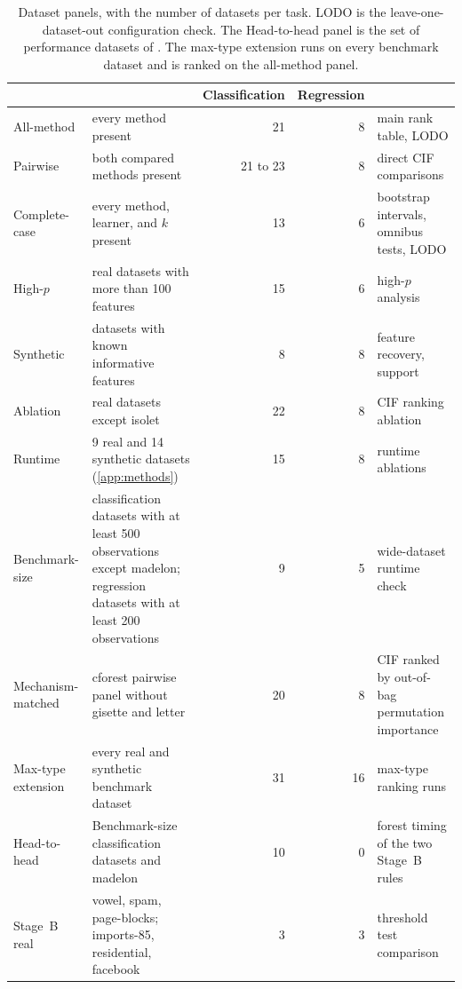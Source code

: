 \begin{table}[htb]
  \centering
  \footnotesize
  \setlength{\tabcolsep}{3pt}
  \begin{tabular}{@{}lL{5.45cm}rrL{3.9cm}@{}}
    \toprule
     &  & Classification & Regression &  \\
    \midrule
    All-method & every method present & 21 & 8 & main rank table, LODO \\
    Pairwise & both compared methods present & 21 to 23 & 8 & direct CIF comparisons \\
    Complete-case & every method, learner, and $k$ present & 13 & 6 & bootstrap intervals, omnibus tests, LODO \\
    High-$p$ & real datasets with more than 100 features & 15 & 6 & high-$p$ analysis \\
    Synthetic & datasets with known informative features & 8 & 8 & feature recovery, support \\
    Ablation & real datasets except isolet & 22 & 8 & CIF ranking ablation \\
    Runtime & 9 real and 14 synthetic datasets (\cref{app:methods}) & 15 & 8 & runtime ablations \\
    Benchmark-size & classification datasets with at least 500 observations except madelon; regression datasets with at least 200 observations & 9 & 5 & wide-dataset runtime check \\
    Mechanism-matched & cforest pairwise panel without gisette and letter & 20 & 8 & CIF ranked by out-of-bag permutation importance \\
    Max-type extension & every real and synthetic benchmark dataset & 31 & 16 & max-type ranking runs \\
    Head-to-head & Benchmark-size classification datasets and madelon & 10 & 0 & forest timing of the two Stage~B rules \\
    Stage~B real & vowel, spam, page-blocks; imports-85, residential, facebook & 3 & 3 & threshold test comparison \\
    \bottomrule
  \end{tabular}
  \caption{Dataset panels, with the number of datasets per task. LODO is the
  leave-one-dataset-out configuration check. The Head-to-head panel is the
  set of performance datasets of \citet{MilletichDownesHirst2026citrees}. The
  max-type extension runs on every benchmark dataset and is ranked on the
  all-method panel.}
  \label{tab:panels}
\end{table}

